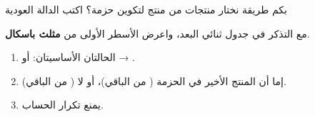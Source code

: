 \begin{statement}
بكم طريقة نختار  منتجات من  منتج لتكوين حزمة؟ اكتب الدالة العودية \par{\centering\small{}\par} مع التذكر في جدول ثنائي البعد، واعرض الأسطر الأولى من \textbf{مثلث باسكال}.
\end{statement}
\begin{stepsbox}\begin{enumerate}
\item الحالتان الأساسيتان:  أو  → .
\item إما أن المنتج الأخير في الحزمة ( من الباقي)، أو لا ( من الباقي).
\item {} يمنع تكرار الحساب.
\end{enumerate}\end{stepsbox}
